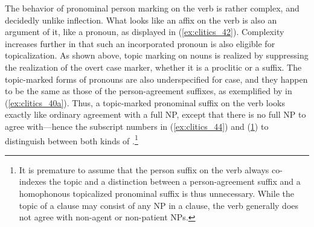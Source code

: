 The behavior of pronominal person marking on the verb is rather
complex, and decidedly unlike inflection. What looks like an affix on the verb
is also an argument of it, like a pronoun, as displayed in
(\ref{ex:clitics_42}). Complexity increases further in that such an incorporated
pronoun is also eligible for topicalization. As shown above, topic marking on nouns is realized
by suppressing the realization of the overt case marker, whether it
is a proclitic or a suffix. The topic-marked
forms of pronouns are also underspecified for case,
and they happen to be the same as those of the
person-agreement suffixes, as exemplified by
 in (\ref{ex:clitics_40a}). Thus, a topic-marked pronominal suffix on the verb looks exactly like ordinary
agreement with a full NP,
except that there is no full NP to agree
with---hence the subscript numbers in (\ref{ex:clitics_44}) and
(\ref{ex:clitics_45}) to distinguish between both kinds of
.\footnote{It is premature to assume that the person
suffix on the verb always co-indexes the topic
and a distinction between a person-agreement
suffix and a homophonous topicalized
pronominal suffix is thus unnecessary. While the topic of a clause may consist of any NP in a clause, the verb generally does not agree with
non-agent or non-patient NPs.}

\begin{figure}
\begin{morphlex}
\ex\label{ex:clitics_45}
\xe
\end{morphlex}
\end{figure}

